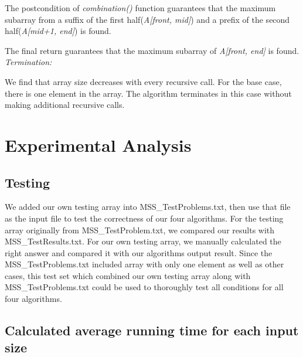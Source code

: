 \documentclass[11pt]{scrreprt}
\begin{document}
The postcondition of \textit{combination()} function guarantees that the maximum subarray from a suffix of the first half(\textit{A[front, mid]}) and a prefix of the second half(\textit{A[mid+1, end]}) is found.

The final return guarantees that the maximum subarray of \textit{A[front, end]} is found. \\
\emph{Termination:}

We find that array size decreases with every recursive call. For the base case, there is one element in the array. The algorithm terminates in this case without making additional recursive calls.


\chapter{Experimental Analysis}

\section{Testing}

We added our own testing array into MSS\_TestProblems.txt, then use that file as the input file to test the correctness of our four algorithms. For the testing array originally from MSS\_TestProblem.txt, we compared our results with MSS\_TestResults.txt. For our own testing array, we manually calculated the right answer and compared it with our algorithms output result. Since the MSS\_TestProblems.txt included array with only one element as well as other cases, this test set which combined our own testing array along with MSS\_TestProblems.txt could be used to thoroughly test all conditions for all four algorithms.

\section {Calculated average running time for each input size}
\end{document}
